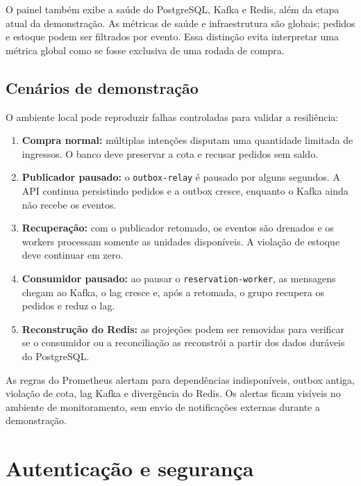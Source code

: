 \documentclass[12pt,a4paper]{article}
\begin{document}
O painel tamb\'em exibe a sa\'ude do PostgreSQL, Kafka e Redis, al\'em da etapa atual da demonstra\c{c}\~ao. As m\'etricas de sa\'ude e infraestrutura s\~ao globais; pedidos e estoque podem ser filtrados por evento. Essa distin\c{c}\~ao evita interpretar uma m\'etrica global como se fosse exclusiva de uma rodada de compra.

\subsection{Cen\'arios de demonstra\c{c}\~ao}

O ambiente local pode reproduzir falhas controladas para validar a resili\^encia:

\begin{enumerate}
  \item \textbf{Compra normal:} m\'ultiplas inten\c{c}\~oes disputam uma quantidade limitada de ingressos. O banco deve preservar a cota e recusar pedidos sem saldo.
  \item \textbf{Publicador pausado:} o \texttt{outbox-relay} \'e pausado por alguns segundos. A API continua persistindo pedidos e a outbox cresce, enquanto o Kafka ainda n\~ao recebe os eventos.
  \item \textbf{Recupera\c{c}\~ao:} com o publicador retomado, os eventos s\~ao drenados e os workers processam somente as unidades dispon\'iveis. A viola\c{c}\~ao de estoque deve continuar em zero.
  \item \textbf{Consumidor pausado:} ao pausar o \texttt{reservation-worker}, as mensagens chegam ao Kafka, o lag cresce e, ap\'os a retomada, o grupo recupera os pedidos e reduz o lag.
  \item \textbf{Reconstru\c{c}\~ao do Redis:} as proje\c{c}\~oes podem ser removidas para verificar se o consumidor ou a reconcilia\c{c}\~ao as reconstr\'oi a partir dos dados dur\'aveis do PostgreSQL.
\end{enumerate}

As regras do Prometheus alertam para depend\^encias indispon\'iveis, outbox antiga, viola\c{c}\~ao de cota, lag Kafka e diverg\^encia do Redis. Os alertas ficam vis\'iveis no ambiente de monitoramento, sem envio de notifica\c{c}\~oes externas durante a demonstra\c{c}\~ao.

\section{Autentica\c{c}\~ao e seguran\c{c}a}
\end{document}
